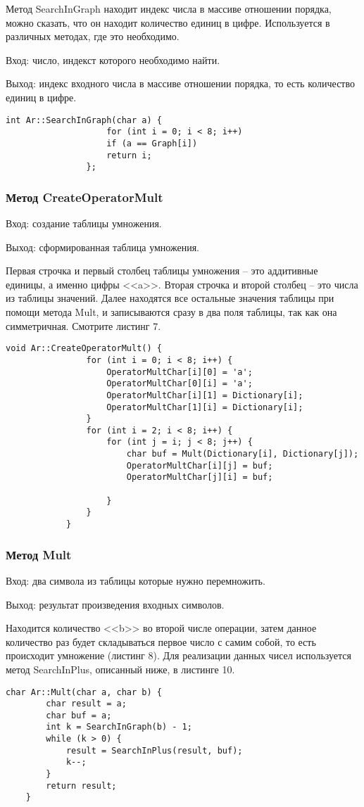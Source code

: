 \documentclass[10pt,a4paper,final]{article} %
\begin{document}
	Метод SearchInGraph находит индекс числа в массиве отношении порядка, можно сказать, что он находит количество единиц в цифре. Используется в различных методах, где это необходимо.

Вход: число, индекст которого необходимо найти.

Выход: индекс входного числа в массиве отношении порядка, то есть количество единиц в цифре.
	
		
			\begin{lstlisting}[caption={Метод SearchInGraph}]
					int Ar::SearchInGraph(char a) {
					for (int i = 0; i < 8; i++)
					if (a == Graph[i])
					return i;
				};
		\end{lstlisting}
		
			\subsubsection{Метод CreateOperatorMult}
				Вход: создание таблицы умножения.
			
			Выход: сформированная таблица умножения.
			
			Первая строчка и первый столбец таблицы умножения -- это аддитивные единицы, а именно цифры <<a>>. Вторая строчка и второй столбец -- это числа из таблицы значений. Далее находятся все остальные значения таблицы при помощи метода Mult, и записываются сразу в два поля таблицы, так как она симметричная. Смотрите листинг 7.
		
		
		\begin{lstlisting}[caption={Метод CreateOperatorMult}]
			void Ar::CreateOperatorMult() {
				for (int i = 0; i < 8; i++) {
					OperatorMultChar[i][0] = 'a';
					OperatorMultChar[0][i] = 'a';
					OperatorMultChar[i][1] = Dictionary[i];
					OperatorMultChar[1][i] = Dictionary[i];
				}
				for (int i = 2; i < 8; i++) {
					for (int j = i; j < 8; j++) {
						char buf = Mult(Dictionary[i], Dictionary[j]);
						OperatorMultChar[i][j] = buf;
						OperatorMultChar[j][i] = buf;
						
					}
				}
			}
		\end{lstlisting}
		
			\subsubsection{Метод Mult}
		Вход: два символа из таблицы которые нужно перемножить.
		
		Выход: результат произведения входных символов.
		
		Находится количество <<b>> во второй числе операции, затем данное количество раз будет складываться первое число с самим собой, то есть происходит умножение (листинг 8). Для реализации данных чисел используется метод SearchInPlus, описанный ниже, в листинге 10. 
		\begin{lstlisting}[caption={Метод Mult}]
	char Ar::Mult(char a, char b) {
		char result = a;
		char buf = a;
		int k = SearchInGraph(b) - 1;
		while (k > 0) {
			result = SearchInPlus(result, buf);
			k--;
		}
		return result;
	}
		\end{lstlisting}
		
\end{document}
